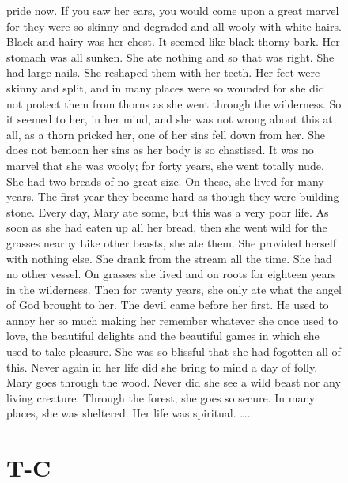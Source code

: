 \documentclass[
  letterpaper,
  DIV=11,
  numbers=noendperiod,
  oneside]{scrreprt}
\begin{document}
\begin{figure}
pride now. If you saw her ears, you would come upon a great marvel for
they were so skinny and degraded and all wooly with white hairs. Black
and hairy was her chest. It seemed like black thorny bark. Her stomach
was all sunken. She ate nothing and so that was right. She had large
nails. She reshaped them with her teeth. Her feet were skinny and split,
and in many places were so wounded for she did not protect them from
thorns as she went through the wilderness. So it seemed to her, in her
mind, and she was not wrong about this at all, as a thorn pricked her,
one of her sins fell down from her. She does not bemoan her sins as her
body is so chastised. It was no marvel that she was wooly; for forty
years, she went totally nude. She had two breads of no great size. On
these, she lived for many years. The first year they became hard as
though they were building stone. Every day, Mary ate some, but this was
a very poor life. As soon as she had eaten up all her bread, then she
went wild for the grasses nearby Like other beasts, she ate them. She
provided herself with nothing else. She drank from the stream all the
time. She had no other vessel. On grasses she lived and on roots for
eighteen years in the wilderness. Then for twenty years, she only ate
what the angel of God brought to her. The devil came before her first.
He used to annoy her so much making her remember whatever she once used
to love, the beautiful delights and the beautiful games in which she
used to take pleasure. She was so blissful that she had fogotten all of
this. Never again in her life did she bring to mind a day of folly. Mary
goes through the wood. Never did she see a wild beast nor any living
creature. Through the forest, she goes so secure. In many places, she
was sheltered. Her life was spiritual. \ldots..

\section{T-C}\label{t-c}


\end{figure}
\end{document}

